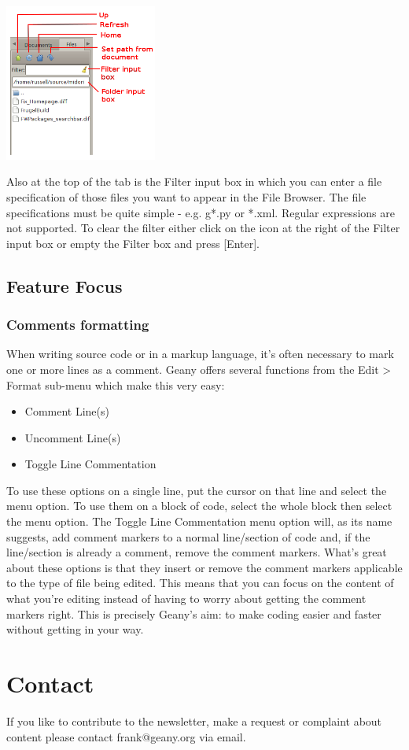 \documentclass[%
paper=a4,%
fontsize=12pt,%
twoside=false,%
DIV18,
headsepline,
plainheadsepline,
footsepline,
plainfootsepline,
parskip=half,%
openany,%
]{scrartcl}
\begin{document}
\includegraphics[width=5cm]{img/issue1_filebrowser.png}

Also at the top of the tab is the Filter input box in which you can
enter a file specification of those files you want to appear in the
File Browser. The file specifications must be quite simple - e.g.
g*.py or *.xml. Regular expressions are not supported. To clear the
filter either click on the icon at the right of the Filter input box
or empty the Filter box and press [Enter].



\subsection{Feature Focus}

\subsubsection{Comments formatting}

When writing source code or in a markup language, it's often
necessary to mark one or more lines as a comment. Geany offers
several functions from the Edit > Format sub-menu which make this
very easy:

\begin{itemize}
	\item Comment Line(s)
	\item Uncomment Line(s)
	\item Toggle Line Commentation
\end{itemize}

To use these options on a single line, put the cursor on that line
and select the menu option. To use them on a block of code, select
the whole block then select the menu option. The Toggle Line
Commentation menu option will, as its name suggests, add comment
markers to a normal line/section of code and, if the line/section is
already a comment, remove the comment markers. What's great about
these options is that they insert or remove the comment markers
applicable to the type of file being edited. This means that you can
focus on the content of what you're editing instead of having to
worry about getting the comment markers right. This is precisely
Geany's aim: to make coding easier and faster without getting in
your way.

\section{Contact}

If you like to contribute to the newsletter, make a request or
complaint about content please contact frank@geany.org via email.
\end{document}
